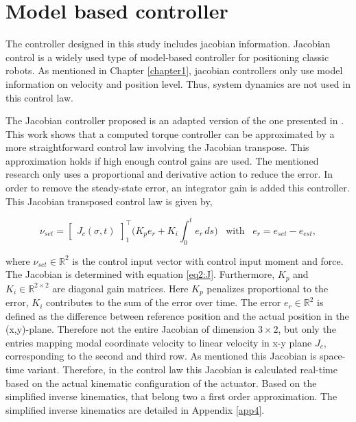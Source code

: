 \section{Model based controller}


The controller designed in this study includes jacobian information. Jacobian control is a widely used type of model-based controller for positioning classic robots. As mentioned in Chapter \ref{chapter1}, jacobian controllers only use model information on velocity and position level. Thus, system dynamics are not used in this control law.


The Jacobian controller proposed is an adapted version of the one presented in \cite{MOOSAVIAN20071226}. This work shows that a computed torque controller can be approximated by a more straightforward control law involving the Jacobian transpose. This approximation holds if high enough control gains are used. The mentioned research only uses a proportional and derivative action to reduce the error. In order to remove the steady-state error, an integrator gain is added this controller. This Jacobian transposed control law is given by,


\begin{equation}
    \nu_{set} = \begin{bmatrix}J_c(\sigma,t)\end{bmatrix}_1^\top \Big(K_p e_r + K_i \int_0^t e_r \hspace{2pt} ds \Big) \hspace{10pt} \text{with} \hspace{10pt} e_r = e_{set}-e_{est}, 
    \label{eq:tau}
\end{equation}

where $\nu_{set} \in \mathbb{R}^2$ is the control input vector with control input moment and force. The Jacobian is determined with equation \ref{eq2:J}. Furthermore, $K_p$ and $K_i \in \mathbb{R}^{2\times 2}$ are diagonal gain matrices. Here $K_p$ penalizes proportional to the error, $K_i$ contributes to the sum of the error over time. The error $e_r \in \mathbb{R}^2$ is defined as the difference between reference position and the actual position in the (x,y)-plane. Therefore not the entire Jacobian of dimension $3 \times 2$, but only the entries mapping modal coordinate velocity to linear velocity in x-y plane $J_c$, corresponding to the second and third row. As mentioned this Jacobian is space-time variant. Therefore, in the control law this Jacobian is calculated real-time based on the actual kinematic configuration of the actuator. Based on the simplified inverse kinematics, that belong two a first order approximation. The simplified inverse kinematics are detailed in Appendix \ref{app4}.

